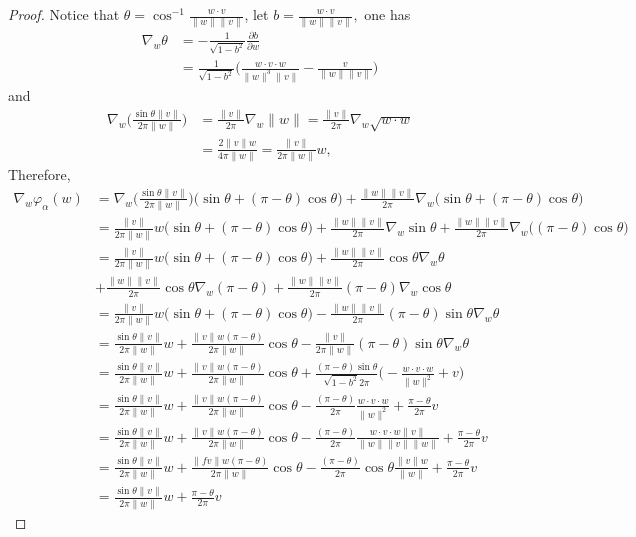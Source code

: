 \documentclass{amsart}%
\begin{document}
\begin{proof}
Notice that
$\theta=\cos^{-1}\frac{ w\cdot  v}{\| w\|\| v\|}$, let $b=\frac{w\cdot  v}{\|w\|\| v\|},$ one has  
\begin{align*}
    \nabla_{w}\theta&=-\frac{1}{\sqrt{1-b^2}}\frac{\partial b}{\partial  w}\\&=\frac{1}{\sqrt{1-b^2}}\Big(\frac
    { w\cdot  v\cdot  w}{\| w\|^3\| v\|}-\frac{ v}{\|w\|\| v\|}\Big)
\end{align*}
and \begin{align*}
\nabla_{ w} \Big(\frac{\sin \theta\| v\|}{2\pi \|w\|}\Big)&=\frac{\| v\|}{2\pi}\nabla_{w}\|w\|=\frac{\| v\|}{2\pi}\nabla_{w}\sqrt{ w\cdot  w}\\&=\frac{2\| v\|w}{4\pi\|w\|}=\frac{\| v\|}{2\pi\|w\|} w,
\end{align*}
Therefore,
  \begin{align*}
    \nabla_{ w} \varphi_{\alpha}( w)&=\nabla_{w} \Big(\frac{\sin \theta\| v\|}{2\pi \|w\|}\Big)\Big(\sin\theta+(\pi-\theta)\cos\theta\Big)+ \frac{\|w\|\| v\|}{2\pi}\nabla_{ w}\Big(\sin\theta+(\pi-\theta)\cos\theta\Big)\\
&=\frac{\| v\|}{2\pi\| w\|} w\Big(\sin\theta+(\pi-\theta)\cos\theta\Big)+ \frac{\|w\|\| v\|}{2\pi}\nabla_{ w}\sin\theta+ \frac{\|w\|\| v\|}{2\pi}\nabla_{w}\Big((\pi-\theta)\cos\theta\Big)\\
&=\frac{\|v\|}{2\pi\| w\|}w\Big(\sin\theta+(\pi-\theta)\cos\theta\Big)+\frac{\| w\|\| v\|}{2\pi}\cos\theta\nabla_{w}\theta\\&+\frac{\| w\|\| v\|}{2\pi}\cos\theta\nabla_{ w}(\pi-\theta)+\frac{\|w\|\| v\|}{2\pi}(\pi-\theta)\nabla_{ w}\cos\theta\\
&=\frac{\|v\|}{2\pi\|w\|}w\Big(\sin\theta+(\pi-\theta)\cos\theta\Big)-\frac{\| w\|\| v\|}{2\pi}(\pi-\theta)\sin\theta\nabla_{ w}\theta\\
&=\frac{\sin\theta\| v\|}{2\pi\|w\|}w+\frac{\| v\| w(\pi-\theta)}{2\pi\| w\|}\cos\theta-\frac{\| v\|}{2\pi\| w\|}(\pi-\theta)\sin\theta\nabla_{ w}\theta\\
&=\frac{\sin\theta\| v\|}{2\pi\| w\|} w+\frac{\|v\| w(\pi-\theta)}{2\pi\|w\|}\cos\theta+\frac{(\pi-\theta)\sin\theta}{\sqrt{1-b^2}2\pi}\Big(-\frac{ w\cdot  v \cdot  w}{\| w\|^2}+v\Big)\\
&=\frac{\sin\theta\| v\|}{2\pi\|w\|}w+\frac{\|v\| w(\pi-\theta)}{2\pi\|w\|}\cos\theta-\frac{(\pi-\theta)}{2\pi}\frac{w\cdot  v\cdot  w}{\| w\|^2}+\frac{\pi-\theta}{2\pi} v\\
&=\frac{\sin\theta\| v\|}{2\pi\|w\|}w+\frac{\|v\| w(\pi-\theta)}{2\pi\|w\|}\cos\theta-\frac{(\pi-\theta)}{2\pi}\frac{w\cdot  v\cdot  w\| v\|}{\| w\|\| v\|\|w\|}+\frac{\pi-\theta}{2\pi} v\\
&=\frac{\sin\theta\| v\|}{2\pi\|w\|}w+\frac{\|f v\| w(\pi-\theta)}{2\pi\|w\|}\cos\theta-\frac{(\pi-\theta)}{2\pi}\cos\theta \frac{\|v\| w}{\| w\|}+\frac{\pi-\theta}{2\pi} v\\
&=\frac{\sin\theta\| v\|}{2\pi\|w\|} w+\frac{\pi-\theta}{2\pi} v
\end{align*}
\end{proof}\vskip0.6cm
\end{document}
